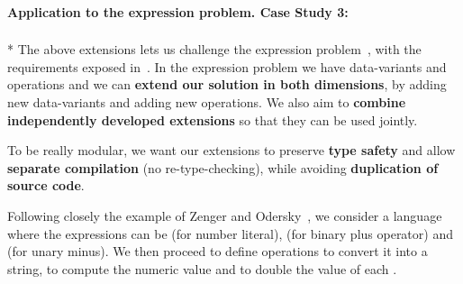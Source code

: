 \paragraph{Application to the expression problem. Case Study 3:}${}_{}$\\*
The above extensions lets us challenge the expression problem~\cite{wadler1998expression},
with the requirements exposed in~\cite{Zenger-Odersky2005}.
In the expression problem we have data-variants and operations and we can
\textbf{extend our solution in both dimensions},
by adding new data-variants and adding new operations.
We also aim to \textbf{combine independently developed extensions} so
that they can be used jointly.

To be really modular, we want our extensions to
preserve \textbf{type safety}
and allow \textbf{separate compilation} (no re-type-checking),
while avoiding \textbf{duplication of source code}.

Following closely
the example of Zenger and Odersky~\cite{Zenger-Odersky2005},
we consider a language where the
expressions \Q@Exp@ can
be \Q@Num@ (for number literal),
\Q@Plus@ (for binary plus operator)
and \Q@Neg@ (for unary minus).
We then proceed to define operations
\Q@show@ to convert it into a string,
 \Q@eval@ to compute the numeric value and 
\Q@double@ to double the value of each \Q@Num@.

